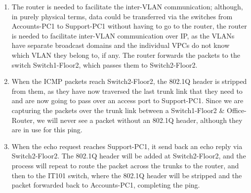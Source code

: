 \documentclass[a4paper]{article}
\begin{document}
\begin{enumerate}
    \item   The router is needed to facilitate the inter-VLAN communication;
            although, in purely physical terms, data could be transferred via the switches from Accounts-PC1 to Support-PC1 without having to go to the router, the 
            router is needed to facilitate inter-VLAN communication over IP, as the VLANs have separate broadcast domains and the individual VPCs do not know which 
            VLAN they belong to, if any.
            The router forwards the packets to the switch Switch1-Floor2, which passes them to Switch2-Floor2.
    
    \item   When the ICMP packets reach Switch2-Floor2, the 802.1Q header is stripped from them, as they have now traversed the last trunk link that they need to 
            and are now going to pass over an access port to Support-PC1.
            Since we are capturing the packets over the trunk link between a Switch1-Floor2 \& Office-Router, we will never see a packet without an 802.1Q header, 
            although they are in use for this ping.

    \item   When the echo request reaches Support-PC1, it send back an echo reply via Switch2-Floor2. 
            The 802.1Q header will be added at Switch2-Floor2, and the process will repeat to route the packet across the trunks to the router, and then to the 
            IT101 switch, where the 802.1Q header will be stripped and the packet forwarded back to Accounts-PC1, completing the ping.
\end{enumerate}
\end{document}
